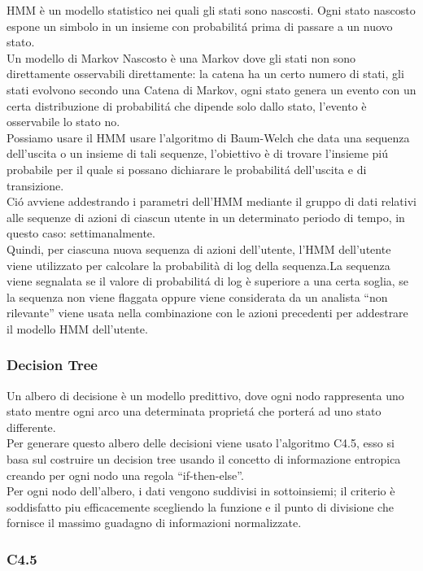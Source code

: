 \documentclass[../tesi.tex]{subfiles}
\begin{document}
HMM è un modello statistico nei quali gli stati sono nascosti. Ogni stato nascosto espone un simbolo in un insieme con probabilitá prima di passare a un nuovo stato.\\
Un modello di Markov Nascosto è una \Gls{Markov} dove gli stati non sono direttamente osservabili direttamente: la catena ha un certo numero di stati, gli stati evolvono secondo una Catena di Markov, ogni stato genera un evento con un certa distribuzione di probabilitá che dipende solo dallo stato, l’evento è osservabile lo stato no.\\
Possiamo usare il HMM usare l’algoritmo di Baum-Welch che data una sequenza dell’uscita o un insieme di tali sequenze, l’obiettivo è di trovare l’insieme piú probabile per il quale si possano dichiarare le probabilitá dell’uscita e di transizione.\\
Ció avviene addestrando i parametri dell’HMM mediante il gruppo di dati relativi alle sequenze di azioni di ciascun utente in un determinato periodo di tempo, in questo caso: settimanalmente.\\
Quindi, per ciascuna nuova sequenza di azioni dell'utente, l'HMM dell'utente viene utilizzato per calcolare la probabilità di log della sequenza.La sequenza viene segnalata se il valore di probabilitá di log è superiore a una certa soglia, se la sequenza non viene flaggata oppure viene considerata da un analista “non rilevante” viene usata nella combinazione con le azioni precedenti per addestrare il modello HMM dell’utente.

\subsubsection{Decision Tree}

Un albero di decisione è un modello predittivo, dove ogni nodo rappresenta uno stato mentre ogni arco una determinata proprietá che porterá ad uno stato differente.\\
Per generare questo albero delle decisioni viene usato l’algoritmo C4.5, esso si basa sul costruire un decision tree usando il concetto di informazione entropica creando per ogni nodo una regola “if-then-else”.\\
Per ogni nodo dell’albero, i dati vengono suddivisi in sottoinsiemi; il criterio è soddisfatto piu efficacemente scegliendo la funzione e il punto di divisione che fornisce il massimo guadagno di informazioni normalizzate.

\subsubsection{C4.5}
\end{document}
